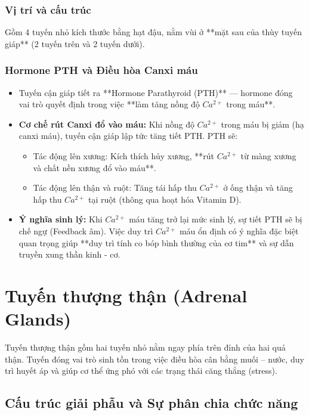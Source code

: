 \subsubsection{Vị trí và cấu trúc}
Gồm 4 tuyến nhỏ kích thước bằng hạt đậu, nằm vùi ở **mặt sau của thùy tuyến giáp** (2 tuyến trên và 2 tuyến dưới).

\subsubsection{Hormone PTH và Điều hòa Canxi máu}
\begin{itemize}
    \item Tuyến cận giáp tiết ra **Hormone Parathyroid (PTH)** — hormone đóng vai trò quyết định trong việc **làm tăng nồng độ $Ca^{2+}$ trong máu**.
    \item \textbf{Cơ chế rút Canxi đổ vào máu:} Khi nồng độ $Ca^{2+}$ trong máu bị giảm (hạ canxi máu), tuyến cận giáp lập tức tăng tiết PTH. PTH sẽ:
    \begin{itemize}
        \item Tác động lên xương: Kích thích hủy xương, **rút $Ca^{2+}$ từ màng xương và chất nền xương đổ vào máu**.
        \item Tác động lên thận và ruột: Tăng tái hấp thu $Ca^{2+}$ ở ống thận và tăng hấp thu $Ca^{2+}$ tại ruột (thông qua hoạt hóa Vitamin D).
    \end{itemize}
    \item \textbf{Ý nghĩa sinh lý:} Khi $Ca^{2+}$ máu tăng trở lại mức sinh lý, sự tiết PTH sẽ bị chế ngự (Feedback âm). Việc duy trì $Ca^{2+}$ máu ổn định có ý nghĩa đặc biệt quan trọng giúp **duy trì tính co bóp bình thường của cơ tim** và sự dẫn truyền xung thần kinh - cơ.
\end{itemize}

\section{Tuyến thượng thận (Adrenal Glands)}

Tuyến thượng thận gồm hai tuyến nhỏ nằm ngay phía trên đỉnh của hai quả thận. Tuyến đóng vai trò sinh tồn trong việc điều hòa cân bằng muối -- nước, duy trì huyết áp và giúp cơ thể ứng phó với các trạng thái căng thẳng (stress).

\subsection{Cấu trúc giải phẫu và Sự phân chia chức năng}

